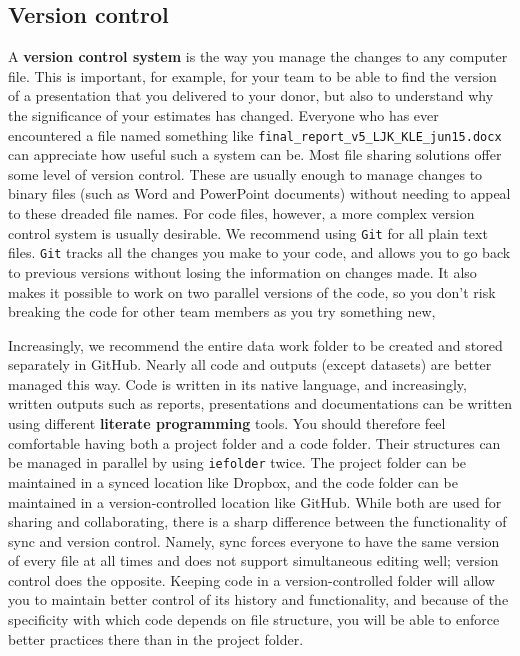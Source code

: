 \subsection{Version control}

A \textbf{version control system} is the way you manage the changes to any computer file.
This is important, for example, for your team to be able to find the version of a presentation that you delivered to your donor,
but also to understand why the significance of your estimates has changed.
Everyone who has ever encountered a file named something like  \texttt{final\_report\_v5\_LJK\_KLE\_jun15.docx}
can appreciate how useful such a system can be.
Most file sharing solutions offer some level of version control.
These are usually enough to manage changes to binary files (such as Word and PowerPoint documents) without needing to appeal to these dreaded file names.
For code files, however, a more complex version control system is usually desirable.
We recommend using \texttt{Git} for all plain text files. 
\texttt{Git} tracks all the changes you make to your code, 
and allows you to go back to previous versions without losing the information on changes made. 
It also makes it possible to work on two parallel versions of the code, 
so you don't risk breaking the code for other team members as you try something new,

Increasingly, we recommend the entire data work folder
to be created and stored separately in GitHub.
Nearly all code and outputs (except datasets) are better managed this way. Code is written in its native language,
and increasingly, written outputs such as reports,
presentations and documentations can be written using different \textbf{literate programming}
 tools.
You should therefore feel comfortable having both a project folder and a code folder.
Their structures can be managed in parallel by using \texttt{iefolder} twice.
The project folder can be maintained in a synced location like Dropbox,
and the code folder can be maintained in a version-controlled location like GitHub.
While both are used for sharing and collaborating,
there is a sharp difference between the functionality of sync and version control.
Namely, sync forces everyone to have the same version of every file at all times
and does not support simultaneous editing well; version control does the opposite.
Keeping code in a version-controlled folder will allow you
to maintain better control of its history and functionality,
and because of the specificity with which code depends on file structure,
you will be able to enforce better practices there than in the project folder.

